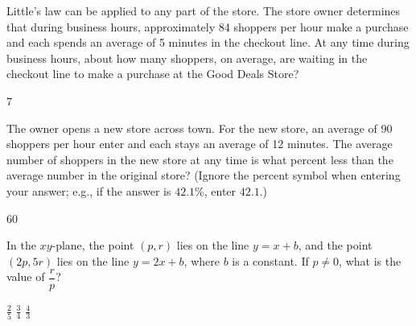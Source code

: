\newpage




\question[1]
Little's law can be applied to any part of the store. The store owner determines that during business hours, approximately 84 shoppers per hour make a purchase and each spends an average of 5 minutes in the checkout line. At any time during business hours, about how many shoppers, on average, are waiting in the checkout line to make a purchase at the Good Deals Store?
\begin{solution}
$7$
\end{solution}

\question[1]
The owner opens a new store across town. For the new store, an average of 90 shoppers per hour enter and each stays an average of 12 minutes. The average number of shoppers in the new store at any time is what percent less than the average number in the original store? (Ignore the percent symbol when entering your answer; e.g., if the answer is $42.1\%$, enter $42.1$.)
\begin{solution}
$60$
\end{solution}



\newpage



\question[1]
In the $xy$-plane, the point $(p, r)$ lies on the line $y = x + b$, and the point $(2p, 5r)$ lies on the line $y = 2x + b$, where $b$ is a constant. If $p \neq 0$, what is the value of $\dfrac{r}{p}$?

\begin{choices}
  \choice $\frac{2}{5}$
  \CorrectChoice $\frac{3}{4}$
  \choice $\frac{4}{3}$
\end{choices} 

